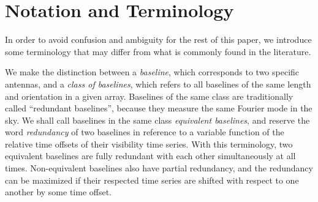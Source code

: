 \documentclass[twocolumn,apj,numberedappendix]{emulateapj}
\renewcommand\[{\begin{equation}}
\renewcommand\]{\end{equation}}
\begin{document}
\section{Notation and Terminology}

In order to avoid confusion and ambiguity for the rest of this paper, we
introduce some terminology that may differ from what is commonly found in the literature. 

We make the distinction between a \textit{baseline}, which corresponds to two specific antennas, and a \textit{class of baselines}, which refers to all baselines of the same length and orientation in a given array. 
Baselines of the same class are traditionally called
``redundant baselines'', because they measure the same Fourier mode
in the sky.  We shall call baselines in the same class \textit{equivalent baselines}, and reserve the word \textit{redundancy} of two baselines in reference to a variable function of the relative time offsets of their visibility time series. With this terminology, two equivalent
baselines are fully redundant with each other simultaneously at all
times. Non-equivalent baselines also have partial redundancy, and the redundancy can be maximized if their
respected time series are shifted with respect to one another by some time offset. 
\end{document}
